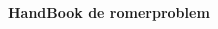 \documentclass[10pt,landscape,letterpaper,notitlepage]{article}
\def\nbtitle#1{\begin{Large}\begin{center}\textbf{#1}\end{center}\end{Large}}
\begin{document}
\nbtitle{HandBook de romerproblem}

\begin{multicols*}{2}



\end{multicols*}
\end{document}
